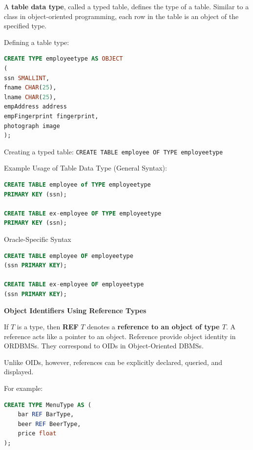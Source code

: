 \documentclass[11pt]{article}
\newcommand{\boldsec}[1]{
    \vspace{11pt}
    \textbf{#1}
    \vspace{11pt}
}
\begin{document}
A \textbf{table data type}, called a typed table, defines the type of a table. Similar to a class in object-oriented programming, each row in the table is an object of the specified type.

Defining a table type:
\vspace{11pt}
\begin{lstlisting}[language=sql, breaklines=true, showstringspaces=false]
CREATE TYPE employeetype AS OBJECT
(
ssn SMALLINT,
fname CHAR(25),
lname CHAR(25),
empAddress address
empFingerprint fingerprint,
photograph image
);
\end{lstlisting}
\vspace{11pt}

Creating a typed table: \texttt{CREATE TABLE employee OF TYPE employeetype}

Example Usage of Table Data Type (General Syntax):
\vspace{11pt}
\begin{lstlisting}[language=sql, breaklines=true, showstringspaces=false]
CREATE TABLE employee of TYPE employeetype
PRIMARY KEY (ssn);

CREATE TABLE ex-employee OF TYPE employeetype
PRIMARY KEY (ssn);
\end{lstlisting}
\vspace{11pt}

Oracle-Specific Syntax
\vspace{11pt}
\begin{lstlisting}[language=sql, breaklines=true, showstringspaces=false]
CREATE TABLE employee OF employeetype
(ssn PRIMARY KEY);

CREATE TABLE ex-employee OF employeetype
(ssn PRIMARY KEY);
\end{lstlisting}
\vspace{11pt}

\boldsec{Object Identifiers Using Reference Types}

If $T$ is a type, then \textbf{REF} $T$ denotes a\textbf{ reference to an object of type $T$}. A reference acts like a pointer to an object. Reference provide object identity in ORDBMSs. They correspond to OIDs in Object-Oriented DBMSs.

Unlike OIDs, however, references can be explicitly declared, queried, and displayed.

For example:
\vspace{11pt}
\begin{lstlisting}[language=sql, breaklines=true, showstringspaces=false]
CREATE TYPE MenuType AS (
    bar REF BarType,
    beer REF BeerType,
    price float
);
\end{lstlisting}
\vspace{11pt}
\end{document}
